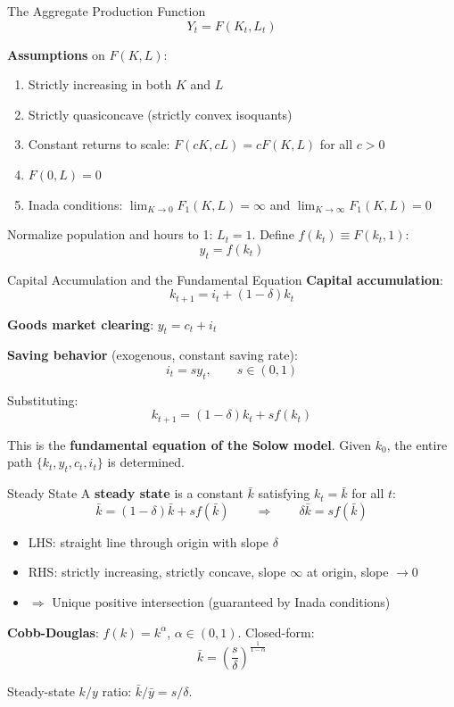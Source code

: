\documentclass[blue]{beamer}
\begin{document}
\begin{frame}{The Aggregate Production Function}
	\[
	Y_t = F(K_t, L_t)
	\]
	
	\textbf{Assumptions} on $F(K,L)$:
	\begin{enumerate}
		\item Strictly increasing in both $K$ and $L$
		\item Strictly quasiconcave (strictly convex isoquants)
		\item Constant returns to scale: $F(cK, cL) = cF(K,L)$ for all $c > 0$
		\item $F(0, L) = 0$
		\item Inada conditions: $\lim_{K \to 0} F_1(K,L) = \infty$ and $\lim_{K \to \infty} F_1(K,L) = 0$
	\end{enumerate}
	
	\bigskip
	Normalize population and hours to 1: $L_t = 1$. Define $f(k_t) \equiv F(k_t, 1)$:
	\[
	y_t = f(k_t)
	\]
\end{frame}

\begin{frame}{Capital Accumulation and the Fundamental Equation}
	\textbf{Capital accumulation}:
	\[
	k_{t+1} = i_t + (1-\delta)k_t
	\]
	
	\textbf{Goods market clearing}: $y_t = c_t + i_t$
	
	\textbf{Saving behavior} (exogenous, constant saving rate):
	\[
	i_t = sy_t, \qquad s \in (0,1)
	\]
	
	\bigskip
	Substituting:
	\[
	k_{t+1} = (1-\delta)k_t + sf(k_t)
	\]
	
	This is the \textbf{fundamental equation of the Solow model}. Given $k_0$, the entire path $\{k_t, y_t, c_t, i_t\}$ is determined.
\end{frame}

\begin{frame}{Steady State}
	A \textbf{steady state} is a constant $\bar{k}$ satisfying $k_t = \bar{k}$ for all $t$:
	\[
	\bar{k} = (1-\delta)\bar{k} + sf(\bar{k}) \qquad \Rightarrow \qquad \delta \bar{k} = sf(\bar{k})
	\]
	
	\begin{itemize}
		\item LHS: straight line through origin with slope $\delta$
		\item RHS: strictly increasing, strictly concave, slope $\infty$ at origin, slope $\to 0$
		\item $\Rightarrow$ Unique positive intersection (guaranteed by Inada conditions)
	\end{itemize}
	
	\bigskip
	\textbf{Cobb-Douglas}: $f(k) = k^\alpha$, $\alpha \in (0,1)$. Closed-form:
	\[
	\bar{k} = \left(\frac{s}{\delta}\right)^{\frac{1}{1-\alpha}}
	\]
	
	Steady-state $k/y$ ratio: $\bar{k}/\bar{y} = s/\delta$.
\end{frame}
\end{document}
